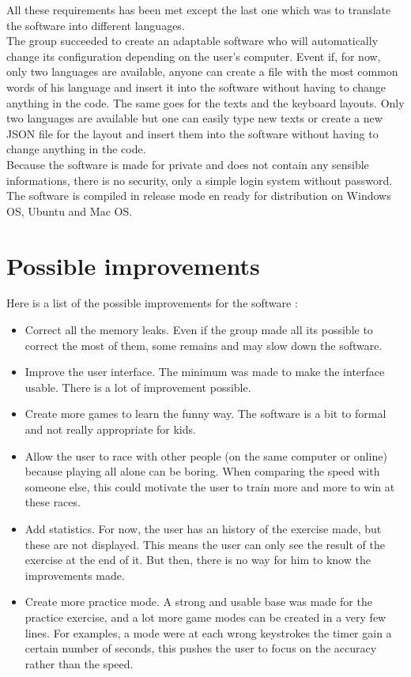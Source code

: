 All these requirements has been met except the last one which was to translate the software into different languages.\\
The group succeeded to create an adaptable software who will automatically change its configuration depending on the user's computer. Event if, for now, only two languages are available, anyone can create a file with the most common words of his language and insert it into the software without having to change anything in the code. The same goes for the texts and the keyboard layouts. Only two languages are available but one can easily type new texts or create a new JSON file for the layout and insert them into the software without having to change anything in the code.\\
Because the software is made for private and does not contain any sensible informations, there is no security, only a simple login system without password.\\
The software is compiled in release mode en ready for distribution on Windows OS, Ubuntu and Mac OS.

\chapter{Possible improvements}
Here is a list of the possible improvements for the software :
\begin{itemize}
	\item Correct all the memory leaks. Even if the group made all its possible to correct the most of them, some remains and may slow down the software.
	\item Improve the user interface. The minimum was made to make the interface usable. There is a lot of improvement possible.
	\item Create more games to learn the funny way. The software is a bit to formal and not really appropriate for kids.
	\item Allow the user to race with other people (on the same computer or online) because playing all alone can be boring. When comparing the speed with someone else, this could motivate the user to train more and more to win at these races.
	\item Add statistics. For now, the user has an history of the exercise made, but these are not displayed. This means the user can only see the result of the exercise at the end of it. But then, there is no way for him to know the improvements made.
	\item Create more practice mode. A strong and usable base was made for the practice exercise, and a lot more game modes can be created in a very few lines. For examples, a mode were at each wrong keystrokes the timer gain a certain number of seconds, this pushes the user to focus on the accuracy rather than the speed.
\end{itemize}


